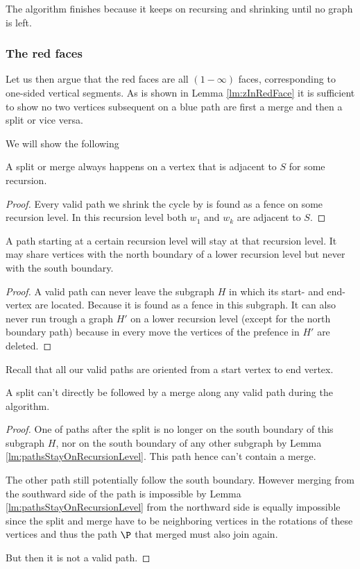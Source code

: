   The algorithm finishes because it keeps on recursing and shrinking until no graph is left.

  \subsubsection{The red faces}
  Let us then argue that the red faces are all $(1-\infty)$ faces, corresponding to one-sided vertical segments. As is shown in Lemma \ref{lm:zInRedFace} it is sufficient to show no two vertices subsequent on a blue path are first a merge and then a split or vice versa.

  We will show the following
  \begin{lemma}
    A split or merge always happens on a vertex that is adjacent to $S$ for some recursion.
  \end{lemma}

  \begin{proof}
    Every valid path we shrink the cycle by is found as a fence on some recursion level. In this recursion level both $w_1$ and $w_k$ are adjacent to $S$.
  \end{proof}

  \begin{lemma}
    \label{lm:pathsStayOnRecursionLevel}
    A path starting at a certain recursion level will stay at that recursion level. It may share vertices with the north boundary of a lower recursion level but never with the south boundary.
  \end{lemma}
  \begin{proof}
    A valid path can never leave the subgraph $H$ in which its start- and end-vertex are located. Because it is found as a fence in this subgraph. It can also never run trough a graph $H'$ on a lower recursion level (except for the north boundary path)  because in every move the vertices of the prefence in $H'$ are deleted.
  \end{proof}

  Recall that all our valid paths are oriented from a start vertex to end vertex.

  \begin{lemma}
    A split can't directly be followed by a merge along any valid path during the algorithm.
  \end{lemma}
  \begin{proof}
    One of paths after the split is no longer on the south boundary of this subgraph $H$, nor on the south boundary of any other subgraph by Lemma \ref{lm:pathsStayOnRecursionLevel}. This path hence can't contain a merge.

    The other path still potentially follow the south boundary. However merging from the southward side of the path is impossible by Lemma \ref{lm:pathsStayOnRecursionLevel} from the northward side is equally impossible since the split and merge have to be neighboring vertices in the rotations of these vertices and thus the path $\P$ that merged must also join again.

    But then it is not a valid path.
  \end{proof}

